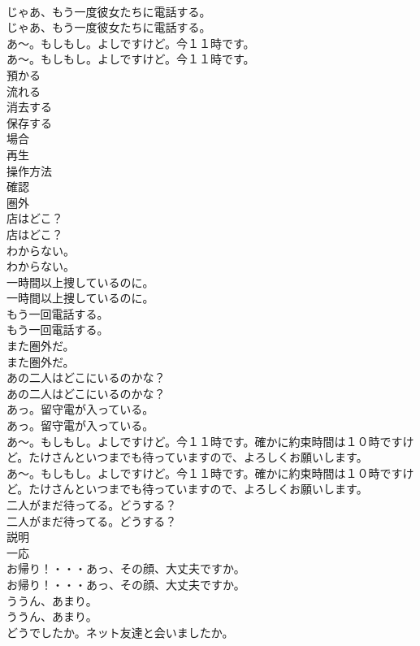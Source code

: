 \documentclass[8pt]{extreport}
\begin{document}
\begin{CJK}{UTF8}{min}
\\	じゃあ、もう一度彼女たちに電話する。	
\\	じゃあ、もう一度彼女たちに電話する。 
\\	あ〜。もしもし。よしですけど。今１１時です。	
\\	あ〜。もしもし。よしですけど。今１１時です。 
\\	預かる
\\	流れる
\\	消去する
\\	保存する
\\	場合
\\	再生
\\	操作方法
\\	確認
\\	圏外
\\	店はどこ？	
\\	店はどこ？ 
\\	わからない。	
\\	わからない。 
\\	一時間以上捜しているのに。	
\\	一時間以上捜しているのに。 
\\	もう一回電話する。	
\\	もう一回電話する。 
\\	また圏外だ。	
\\	また圏外だ。 
\\	あの二人はどこにいるのかな？	
\\	あの二人はどこにいるのかな？ 
\\	あっ。留守電が入っている。	
\\	あっ。留守電が入っている。 
\\	あ〜。もしもし。よしですけど。今１１時です。確かに約束時間は１０時ですけど。たけさんといつまでも待っていますので、よろしくお願いします。	
\\	あ〜。もしもし。よしですけど。今１１時です。確かに約束時間は１０時ですけど。たけさんといつまでも待っていますので、よろしくお願いします。 
\\	二人がまだ待ってる。どうする？	
\\	二人がまだ待ってる。どうする？ 
\\	説明
\\	一応
\\	お帰り！・・・あっ、その顔、大丈夫ですか。	
\\	お帰り！・・・あっ、その顔、大丈夫ですか。 
\\	ううん、あまり。	
\\	ううん、あまり。 
\\	どうでしたか。ネット友達と会いましたか。	

\end{CJK}
\end{document}
